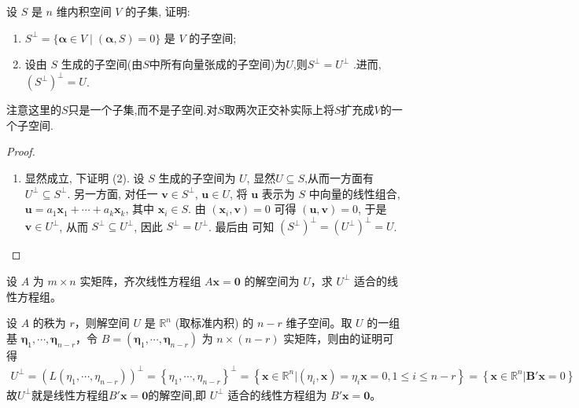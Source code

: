 \documentclass[../../main.tex]{subfiles}%
\begin{document}
\begin{proposition}\label{proposition:例9.19}
设 $S$ 是 $n$ 维内积空间 $V$ 的子集, 证明:
\begin{enumerate}[(1)]
\item $S^\perp = \{ \boldsymbol{\alpha} \in V \mid (\boldsymbol{\alpha}, S) = 0\}$ 是 $V$ 的子空间;
\item 设由 $S$ 生成的子空间(由$S$中所有向量张成的子空间)为$U$,则$S^\perp=U^\perp$ .进而,$(S^\perp)^\perp=U$.
\end{enumerate}
\end{proposition}
\begin{remark}
注意这里的$S$只是一个子集,而不是子空间.对$S$取两次正交补实际上将$S$扩充成$V$的一个子空间.
\end{remark}
\begin{proof}
\begin{enumerate}[(1)]
\item 显然成立, 下证明 (2). 设 $S$ 生成的子空间为 $U$, 显然$U\subseteq S$,从而一方面有 $U^\perp \subseteq S^\perp$. 另一方面, 对任一 $\boldsymbol{v} \in S^\perp$, $\boldsymbol{u} \in U$, 将 $\boldsymbol{u}$ 表示为 $S$ 中向量的线性组合, $\boldsymbol{u} = a_1\boldsymbol{x}_1 + \cdots + a_k\boldsymbol{x}_k$, 其中 $\boldsymbol{x}_i \in S$. 由 $(\boldsymbol{x}_i, \boldsymbol{v}) = 0$ 可得 $(\boldsymbol{u}, \boldsymbol{v}) = 0$, 于是 $\boldsymbol{v} \in U^\perp$, 从而 $S^\perp \subseteq U^\perp$, 因此 $S^\perp = U^\perp$. 最后由 可知 $(S^\perp)^\perp = (U^\perp)^\perp = U$. 
\end{enumerate} 

\end{proof}

\begin{proposition}\label{proposition:例9.20}
设 $A$ 为 $m \times n$ 实矩阵，齐次线性方程组 $A\boldsymbol{x} = \boldsymbol{0}$ 的解空间为 $U$，求 $U^{\perp}$ 适合的线性方程组。
\end{proposition}
\begin{solution}

设 $A$ 的秩为 $r$，则解空间 $U$ 是 $\mathbb{R}^n$ (取标准内积) 的 $n - r$ 维子空间。取 $U$ 的一组基 $\boldsymbol{\eta}_1, \cdots, \boldsymbol{\eta}_{n - r}$，令 $B = (\boldsymbol{\eta}_1, \cdots, \boldsymbol{\eta}_{n - r})$ 为 $n \times (n - r)$ 实矩阵，则由的证明可得
\begin{align*}
U^{\bot}=\left( L\left( \eta _1,\cdots ,\eta _{n-r} \right) \right) ^{\bot}=\left\{ \eta _1,\cdots ,\eta _{n-r} \right\} ^{\bot}=\left\{ \boldsymbol{x}\in \mathbb{R} ^n|\left( \eta _i,\boldsymbol{x} \right) =\eta _i\boldsymbol{x}=0,1\leqslant i\leqslant n-r \right\} =\left\{ \boldsymbol{x}\in \mathbb{R} ^n|\boldsymbol{B}' \boldsymbol{x}=0 \right\} 
\end{align*}
故$U^{\perp}$就是线性方程组$B'\boldsymbol{x} = \boldsymbol{0}$的解空间,即 $U^{\perp}$ 适合的线性方程组为 $B'\boldsymbol{x} = \boldsymbol{0}$。

\end{solution}
\end{document}
